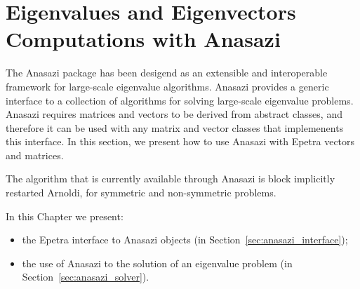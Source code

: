 % 
% 
% 
%   
%   
% 
% 

\section{Eigenvalues and Eigenvectors Computations with Anasazi}
\label{chap:anasazi}

The Anasazi package has been desigend as an extensible and interoperable
framework for large-scale eigenvalue algorithms. Anasazi provides a
generic interface to a collection of algorithms for solving large-scale
eigenvalue problems. Anasazi requires matrices and vectors to be derived
from abstract classes, and therefore it can be used with any matrix and
vector classes that implemenents this interface. In this section, we
present how to use Anasazi with Epetra vectors and matrices.

The algorithm that is currently available through Anasazi is block
implicitly restarted Arnoldi, for symmetric and non-symmetric problems.

In this Chapter we present:
\begin{itemize}
\item the Epetra interface to Anasazi objects (in
  Section~\ref{sec:anasazi_interface});
\item the use of Anasazi to the solution of an eigenvalue problem (in
  Section~\ref{sec:anasazi_solver}).
\end{itemize}

